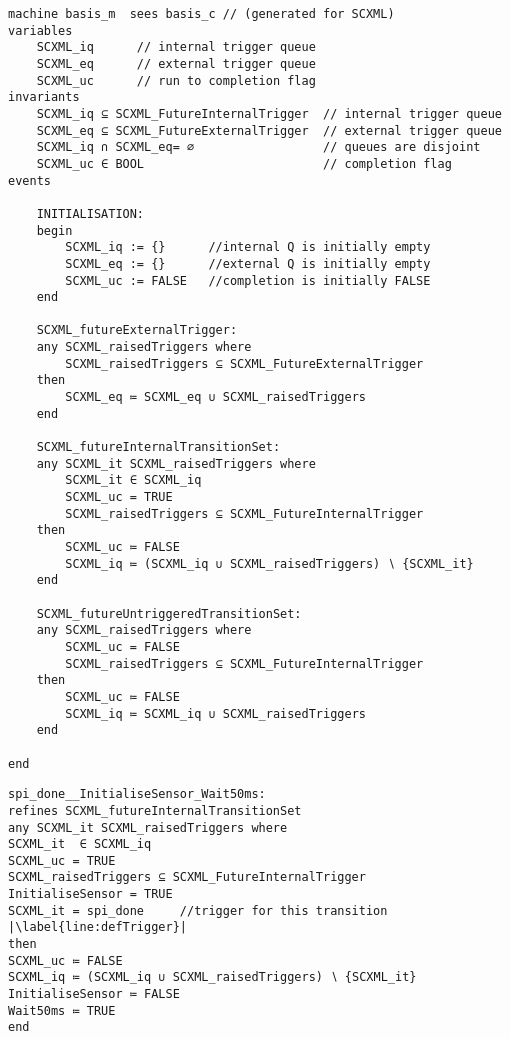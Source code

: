 \begin{lstfloat}[!tb]
\begin{lstlisting}[caption={Abstract basis machine (part of)}, label={lst:BasisMachine},language=Event-B, escapechar=|, frame=single, basicstyle=\rmfamily\scriptsize, belowskip=-2.0 \baselineskip]
machine basis_m  sees basis_c // (generated for SCXML)
variables
	SCXML_iq	  // internal trigger queue
	SCXML_eq	  // external trigger queue
	SCXML_uc	  // run to completion flag
invariants
	SCXML_iq ⊆ SCXML_FutureInternalTrigger	// internal trigger queue
	SCXML_eq ⊆ SCXML_FutureExternalTrigger	// external trigger queue
	SCXML_iq ∩ SCXML_eq= ∅					// queues are disjoint
	SCXML_uc ∈ BOOL							// completion flag
events

	INITIALISATION: 
	begin
		SCXML_iq := {}		//internal Q is initially empty
		SCXML_eq := {}		//external Q is initially empty
		SCXML_uc := FALSE	//completion is initially FALSE
	end

	SCXML_futureExternalTrigger: 
	any SCXML_raisedTriggers where
		SCXML_raisedTriggers ⊆ SCXML_FutureExternalTrigger 
	then
		SCXML_eq ≔ SCXML_eq ∪ SCXML_raisedTriggers 
	end

	SCXML_futureInternalTransitionSet: 
	any SCXML_it SCXML_raisedTriggers where
		SCXML_it ∈ SCXML_iq 
		SCXML_uc = TRUE 
		SCXML_raisedTriggers ⊆ SCXML_FutureInternalTrigger 
	then
		SCXML_uc ≔ FALSE 
		SCXML_iq ≔ (SCXML_iq ∪ SCXML_raisedTriggers) ∖ {SCXML_it} 
	end

	SCXML_futureUntriggeredTransitionSet: 
	any SCXML_raisedTriggers where
		SCXML_uc = FALSE
		SCXML_raisedTriggers ⊆ SCXML_FutureInternalTrigger
	then
		SCXML_uc ≔ FALSE 
		SCXML_iq ≔ SCXML_iq ∪ SCXML_raisedTriggers 
	end

end
\end{lstlisting}
\end{lstfloat}

\begin{lstfloat}[!tb]
\begin{lstlisting}[caption={Event-B event corresponding to internal triggered transition to \textbf{Wait50ms} state in refinement level 1 shown in Fig.~\ref{fig:ASIC}}, label={lst:SecBotMach0},language=Event-B, escapechar=|, frame=single, belowskip=-2.0 \baselineskip]
spi_done__InitialiseSensor_Wait50ms:	
refines SCXML_futureInternalTransitionSet 
any SCXML_it SCXML_raisedTriggers where
SCXML_it  ∈ SCXML_iq 
SCXML_uc = TRUE
SCXML_raisedTriggers ⊆ SCXML_FutureInternalTrigger
InitialiseSensor = TRUE
SCXML_it = spi_done  	//trigger for this transition |\label{line:defTrigger}|
then
SCXML_uc ≔ FALSE
SCXML_iq ≔ (SCXML_iq ∪ SCXML_raisedTriggers) ∖ {SCXML_it}
InitialiseSensor ≔ FALSE
Wait50ms ≔ TRUE
end
\end{lstlisting}
\end{lstfloat}

